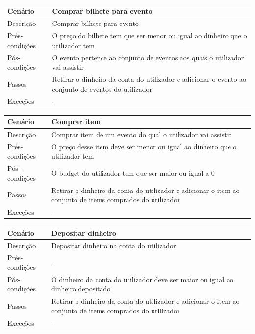 \documentclass{article}
\begin{document}
\begin{center}
\begin{tabular}{ |p{2.5cm}|p{9cm}| }
\hline
 Cenário & Comprar bilhete para evento \\
\hline
Descrição & Comprar bilhete para evento\\
\hline
 Prés-condições &  O preço do bilhete tem que ser menor ou igual ao dinheiro que o utilizador tem\\
\hline
Pós-condições & O evento pertence ao conjunto de eventos aos quais o utilizador vai assistir\\
\hline
Passos &  Retirar o dinheiro da conta do utilizador e adicionar o evento ao conjunto de eventos do utilizador\\
\hline
Exceções & -\\
\hline
\end{tabular}
\end{center}

\begin{center}
\begin{tabular}{ |p{2.5cm}|p{9cm}| }
\hline
 Cenário & Comprar item \\
\hline
Descrição & Comprar item de um evento do qual o utilizador vai assistir\\
\hline
 Prés-condições &  O preço desse item deve ser menor ou igual ao dinheiro que o utilizador tem\\
\hline
Pós-condições & O budget do utilizador tem que ser maior ou igual a 0\\
\hline
Passos &  Retirar o dinheiro da conta do utilizador e adicionar o item ao conjunto de items comprados do utilizador\\
\hline
Exceções & -\\
\hline
\end{tabular}
\end{center}

\begin{center}
\begin{tabular}{ |p{2.5cm}|p{9cm}| }
\hline
 Cenário & Depositar dinheiro \\
\hline
Descrição & Depositar dinheiro na conta do utilizador\\
\hline
 Prés-condições &  -\\
\hline
Pós-condições & O dinheiro da conta do utilizador deve ser maior ou igual ao dinheiro depositado\\
\hline
Passos &  Retirar o dinheiro da conta do utilizador e adicionar o item ao conjunto de items comprados do utilizador\\
\hline
Exceções & -\\
\hline
\end{tabular}
\end{center}
\end{document}
